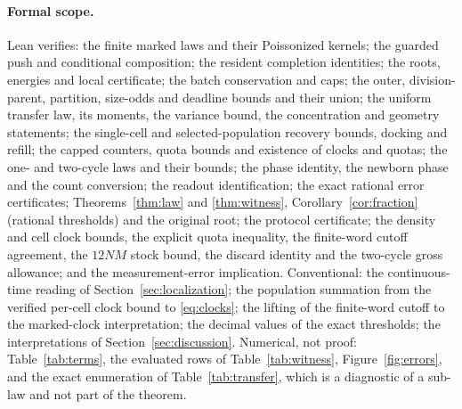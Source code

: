 \documentclass[11pt,a4paper]{article}
\theoremstyle{plain}
\theoremstyle{definition}
\theoremstyle{remark}
\begin{document}
\paragraph{Formal scope.}
Lean verifies: the finite marked laws and their Poissonized kernels; the guarded push and conditional composition; the resident completion identities; the roots, energies and local certificate; the batch conservation and caps; the outer, division-parent, partition, size-odds and deadline bounds and their union; the uniform transfer law, its moments, the variance bound, the concentration and geometry statements; the single-cell and selected-population recovery bounds, docking and refill; the capped counters, quota bounds and existence of clocks and quotas; the one- and two-cycle laws and their bounds; the phase identity, the newborn phase and the count conversion; the readout identification; the exact rational error certificates; Theorems~\ref{thm:law} and \ref{thm:witness}, Corollary~\ref{cor:fraction} (rational thresholds) and the original root; the protocol certificate; the density and cell clock bounds, the explicit quota inequality, the finite-word cutoff agreement, the $12NM$ stock bound, the discard identity and the two-cycle gross allowance; and the measurement-error implication. Conventional: the continuous-time reading of Section~\ref{sec:localization}; the population summation from the verified per-cell clock bound to \eqref{eq:clocks}; the lifting of the finite-word cutoff to the marked-clock interpretation; the decimal values of the exact thresholds; the interpretations of Section~\ref{sec:discussion}. Numerical, not proof: Table~\ref{tab:terms}, the evaluated rows of Table~\ref{tab:witness}, Figure~\ref{fig:errors}, and the exact enumeration of Table~\ref{tab:transfer}, which is a diagnostic of a sub-law and not part of the theorem.



\end{document}
